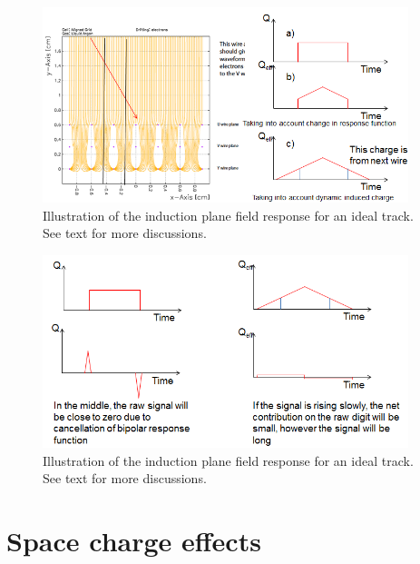 \begin{figure}[!h!tbp]
\includegraphics[width=0.95\textwidth]{figures/ideal_track.png}
\caption{Illustration of the induction plane field response for an ideal track. See text for more 
discussions. }
\label{fig:ideal_track_1}
\end{figure}

\begin{figure}[!h!tbp]
\includegraphics[width=0.95\textwidth]{figures/ideal_track_2.png}
\caption{Illustration of the induction plane field response for an ideal track. See text for more 
discussions.}
\label{fig:ideal_track_2}
\end{figure}



\section{Space charge effects}

